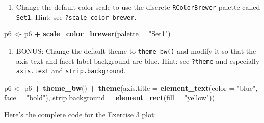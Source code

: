 \documentclass[
]{book}
\newenvironment{Shaded}{\begin{snugshade}}{\end{snugshade}}
\newcommand{\DataTypeTok}[1]{\textcolor[rgb]{0.13,0.29,0.53}{#1}}
\newcommand{\KeywordTok}[1]{\textcolor[rgb]{0.13,0.29,0.53}{\textbf{#1}}}
\newcommand{\NormalTok}[1]{#1}
\newcommand{\OperatorTok}[1]{\textcolor[rgb]{0.81,0.36,0.00}{\textbf{#1}}}
\newcommand{\StringTok}[1]{\textcolor[rgb]{0.31,0.60,0.02}{#1}}
\providecommand{\tightlist}{%
  \setlength{\itemsep}{0pt}\setlength{\parskip}{0pt}}
\begin{document}
\begin{alert}
\begin{enumerate}
\def\labelenumi{\arabic{enumi}.}
\setcounter{enumi}{4}
\tightlist
\item
  Change the default color scale to use the discrete \texttt{RColorBrewer} palette called \texttt{Set1}. Hint: see \texttt{?scale\_color\_brewer}.
\end{enumerate}

\begin{Shaded}
\begin{Highlighting}[]
\NormalTok{p6 \textless{}{-}}\StringTok{ }\NormalTok{p6 }\OperatorTok{+}\StringTok{ }\KeywordTok{scale\_color\_brewer}\NormalTok{(}\DataTypeTok{palette =} \StringTok{"Set1"}\NormalTok{)}
\end{Highlighting}
\end{Shaded}

\begin{enumerate}
\def\labelenumi{\arabic{enumi}.}
\setcounter{enumi}{5}
\tightlist
\item
  BONUS: Change the default theme to \texttt{theme\_bw()} and modify it so that the axis text and facet label background are blue. Hint: see \texttt{?theme} and especially \texttt{axis.text} and \texttt{strip.background}.
\end{enumerate}

\begin{Shaded}
\begin{Highlighting}[]
\NormalTok{p6 \textless{}{-}}\StringTok{ }\NormalTok{p6 }\OperatorTok{+}\StringTok{ }\KeywordTok{theme\_bw}\NormalTok{() }\OperatorTok{+}
\StringTok{    }\KeywordTok{theme}\NormalTok{(}\DataTypeTok{axis.title =} \KeywordTok{element\_text}\NormalTok{(}\DataTypeTok{color =} \StringTok{"blue"}\NormalTok{, }\DataTypeTok{face =} \StringTok{"bold"}\NormalTok{),}
          \DataTypeTok{strip.background =} \KeywordTok{element\_rect}\NormalTok{(}\DataTypeTok{fill =} \StringTok{"yellow"}\NormalTok{))}
\end{Highlighting}
\end{Shaded}

Here's the complete code for the Exercise 3 plot:


\end{alert}
\end{document}
